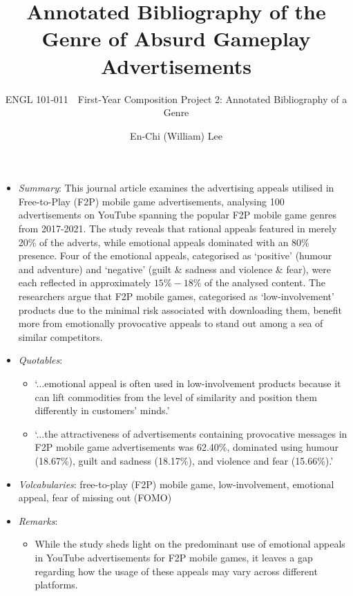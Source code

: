 \documentclass[a4paper, 12pt, mla]{homework}
\title{Annotated Bibliography of the Genre of Absurd Gameplay Advertisements}
\subtitle{ENGL 101-011\ \ First-Year Composition \linebreak Project 2: Annotated Bibliography of a Genre}
\author{En-Chi (William) Lee}
\begin{document}
\maketitle

\begin{abibliography}
	\begin{itemize}
		\item \textit{Summary}: 
			This journal article examines the advertising appeals utilised in Free-to-Play (F2P) mobile game advertisements, analysing 100 advertisements on YouTube spanning the popular F2P mobile game genres from 2017-2021. 
			The study reveals that rational appeals featured in merely 20\% of the adverts, while emotional appeals dominated with an 80\% presence. 
			Four of the emotional appeals, categorised as `positive' (humour and adventure) and `negative' (guilt \& sadness and violence \& fear), were each reflected in approximately $15\%-18\%$ of the analysed content.
			The researchers argue that F2P mobile games, categorised as `low-involvement' products due to the minimal risk associated with downloading them, benefit more from emotionally provocative appeals to stand out among a sea of similar competitors.
		\item \textit{Quotables}:
			\begin{itemize}
				\item `...emotional appeal is often used in low-involvement products because it can lift commodities from the level of similarity and position them differently in customers' minds.'
				\item `...the attractiveness of advertisements containing provocative messages in F2P mobile game advertisements was 62.40\%, dominated using humour (18.67\%), guilt and sadness (18.17\%), and violence and fear (15.66\%).'
			\end{itemize}
		\item \textit{Volcabularies}: free-to-play (F2P) mobile game, low-involvement, emotional appeal, fear of missing out (FOMO)
		\item \textit{Remarks}:
			\begin{itemize}
				\item While the study sheds light on the predominant use of emotional appeals in YouTube advertisements for F2P mobile games, it leaves a gap regarding how the usage of these appeals may vary across different platforms. 

\end{itemize}
\end{itemize}
\end{abibliography}
\end{document}
